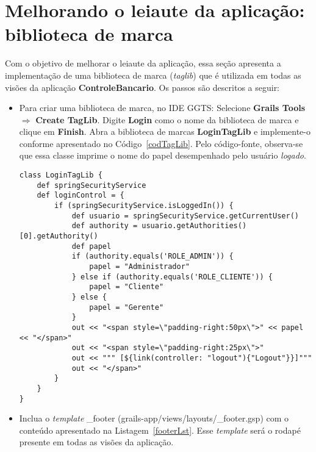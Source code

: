 \newpage

\section{Melhorando o leiaute da aplicação: biblioteca de marca}

\vspace{0.3cm}

Com  o objetivo  de melhorar  o  leiaute da  aplicação, essa  seção apresenta  a
implementação de uma biblioteca de marca ({\it taglib}) que é utilizada em todas
as visões da aplicação {\bf ControleBancario}. Os passos são descritos a seguir: 

\begin{itemize}

\vspace{0.3cm}

\item Para  criar uma biblioteca  de marca, no  IDE GGTS: Selecione  {\bf Grails
  Tools} $\Longrightarrow$ {\bf Create TagLib}.   Digite {\bf Login} como o nome
  da biblioteca de  marca e clique em {\bf Finish}. Abra  a biblioteca de marcas
  {\bf     LoginTagLib}    e     implemente-o     conforme    apresentado     no
  Código~\ref{codTagLib}.  Pelo código-fonte, observa-se que essa classe imprime
  o nome do papel desempenhado pelo usuário {\it logado}.  

\begin{lstlisting}[caption=Biblioteca  de marca  {\bf  LoginTagLib}, frame=trBL,
    float=htbp, label=codTagLib] 
class LoginTagLib {
    def springSecurityService
    def loginControl = {
        if (springSecurityService.isLoggedIn()) {
            def usuario = springSecurityService.getCurrentUser()
            def authority = usuario.getAuthorities()[0].getAuthority()
            def papel
            if (authority.equals('ROLE_ADMIN')) {
                papel = "Administrador"
            } else if (authority.equals('ROLE_CLIENTE')) {
                papel = "Cliente"
            } else {
                papel = "Gerente"
            }
            out << "<span style=\"padding-right:50px\">" << papel << "</span>"
            out << "<span style=\"padding-right:25px\">"
            out << """ [${link(controller: "logout"){"Logout"}}]"""
            out << "</span>"
        }
    }
}
\end{lstlisting}

\item Inclua o  {\it template} \_footer (grails-app/views/layouts/\_footer.gsp)
  com o  conteúdo apresentado  na Listagem~\ref{footerLst}. Esse  {\it template}
  será o rodapé presente em todas as visões da aplicação.


\end{itemize}
